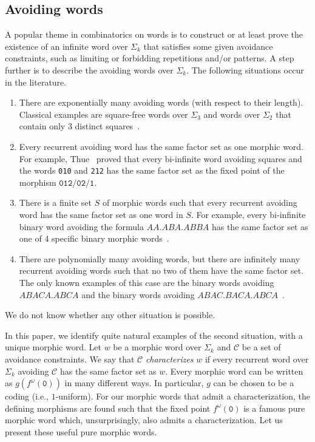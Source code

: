 \documentclass{article}
\theoremstyle{plain}
\theoremstyle{definition}
\theoremstyle{remark}
\begin{document}
\subsection{Avoiding words}
A popular theme in combinatorics on words is to construct or at least prove the existence of
an infinite word over $\Sigma_k$ that satisfies some given avoidance constraints, such as
limiting or forbidding repetitions and/or patterns.
A step further is to describe the avoiding words over $\Sigma_k$. The following situations occur in the literature.
\begin{enumerate}
 \item There are exponentially many avoiding words (with respect to their length).
 Classical examples are square-free words over $\Sigma_3$
 and words over $\Sigma_2$ that contain only 3 distinct squares~\cite{Shur:2012,Ochem2004}.
 \item Every recurrent avoiding word has the same factor set as one morphic word.
 For example, Thue~\cite{Thue06,Thue:1912} proved that every bi-infinite word
 avoiding squares and the words \texttt{010} and \texttt{212} has the same factor set as 
 the fixed point of the morphism $\texttt{012}/\texttt{02}/\texttt{1}$.
 \item There is a finite set $S$ of morphic words such that every recurrent avoiding word has the same factor set as one word in $S$.
For example, every bi-infinite binary word avoiding the formula $AA.ABA.ABBA$
 has the same factor set as one of 4 specific binary morphic words~\cite{OchemRosenfeld2016}.
 \item There are polynomially many avoiding words, but there are infinitely many recurrent avoiding words
 such that no two of them have the same factor set. The only known examples of this case are the binary words
 avoiding $ABACA.ABCA$ and the binary words avoiding $ABAC.BACA.ABCA$~\cite{OchemRosenfeld2017}.
\end{enumerate}
We do not know whether any other situation is possible.

In this paper, we identify quite natural examples of the second situation, with a unique morphic word.
Let $w$ be a morphic word over $\Sigma_k$ and $\mathcal{C}$ be a set of avoidance constraints.
We say that $\mathcal{C}$ \emph{characterizes} $w$
if every recurrent word over $\Sigma_k$ avoiding $\mathcal{C}$ has the same factor set as $w$.
Every morphic word can be written as $g(f^\omega(\texttt{0}))$ in many different ways.
In particular, $g$ can be chosen to be a coding (i.e., $1$-uniform).
For our morphic words that admit a characterization, the defining morphisms are found
such that the fixed point $f^\omega(\texttt{0})$ is a famous pure morphic word
which, unsurprisingly, also admits a characterization.
Let us present these useful pure morphic words.
\end{document}
